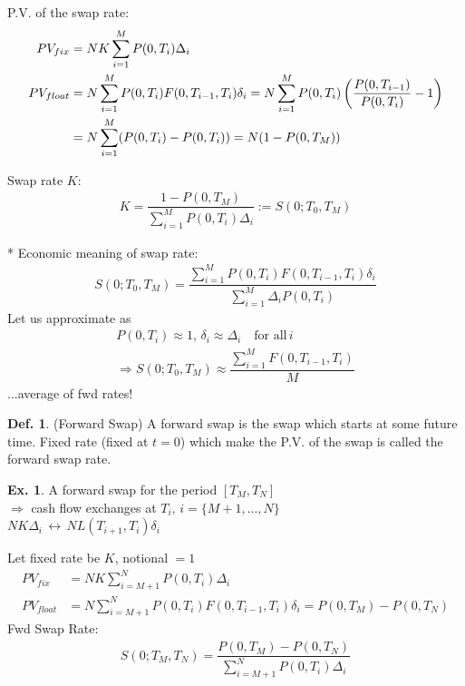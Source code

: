\documentclass[a4paper,11pt]{jsarticle}
\theoremstyle{definition}
\newtheorem{definition}{Def.}[subsection]
\newtheorem{ex}{Ex.}[subsection]
\newcommand{\df}[2]{\dfrac{#1}{#2}}
\begin{document}
P.V. of the swap rate:
\begin{align}
  PV_{fix}&=NK\sum_{i=1}^M P(0,T_i)\Delta_i \\
  PV_{float}&=N\sum_{i=1}^M P(0,T_i)F(0,T_{i-1},T_i)\delta_i
  =N\sum_{i=1}^M P(0,T_i)
  \left(\df{P(0,T_{i-1})}{P(0,T_i)}-1\right) \notag \\
  &=N\sum_{i=1}^M (P(0,T_i)-P(0,T_i))
  =N(1-P(0,T_M))
\end{align}

Swap rate $K$:
\begin{align}
  K=\df{1-P(0,T_M)}{\sum_{i=1}^M P(0,T_i)\Delta_i}
  :=S(0;T_0,T_M)
\end{align}

* Economic meaning of swap rate:
\begin{align}
  S(0;T_0,T_M)
  =\df{\sum_{i=1}^M P(0,T_i)F(0,T_{i-1},T_i)\delta_i}
  {\sum_{i=1}^M \Delta_i P(0,T_i)}
\end{align}
Let us approximate as
\begin{align}
  P(0,T_i)\approx 1, \, \delta_i\approx\Delta_i
  \quad \mbox{for all} \, i \\
  \Rightarrow
  S(0;T_0,T_M)\approx\df{\sum_{i=1}^M F(0,T_{i-1},T_i)}{M} 
\end{align}
...average of fwd rates!

\begin{definition}{(Forward Swap)}
  A forward swap is the swap which starts at some future time.
  Fixed rate (fixed at $t=0$) which make the P.V. of the swap
  is called the forward swap rate.
\end{definition}

\begin{ex}
  A forward swap for the period $[T_M,T_N]$ \\
  $\Rightarrow$ cash flow exchanges
  at $T_i, \, i=\{M+1, ..., N\} $ \\
  $NK\Delta_i \, \leftrightarrow \, NL(T_{i+1},T_i)\delta_i$

  Let fixed rate be $K$, notional $=1$
  \begin{align}
    PV_{fix}&=NK\sum_{i=M+1}^N P(0,T_i)\Delta_i \\
    PV_{float}&=N\sum_{i=M+1}^N P(0,T_i)F(0,T_{i-1},T_i)
    \delta_i = P(0,T_M)-P(0,T_N)
  \end{align}
  Fwd Swap Rate:
  \begin{align}
    S(0;T_M,T_N)
    =\df{P(0,T_M)-P(0,T_N)}{\sum_{i=M+1}^N P(0,T_i)\Delta_i}
  \end{align}
\end{ex}
\end{document}

